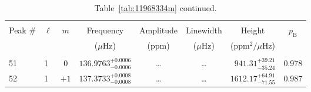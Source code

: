 



\begin{table*}[!]
\caption{Table~\ref{tab:11968334m} continued.}
\label{tab:11968334m2}
\centering
\begin{tabular}{llcrrlrc}
\hline\hline
\\[-8pt]          
Peak \# & $\ell$ & $m$ & \multicolumn{1}{c}{Frequency} & \multicolumn{1}{c}{Amplitude} & \multicolumn{1}{c}{Linewidth} & \multicolumn{1}{c}{Height}& $p_\mathrm{B}$\\
 & & & \multicolumn{1}{c}{($\mu$Hz)} & \multicolumn{1}{c}{(ppm)} & \multicolumn{1}{c}{($\mu$Hz)} & \multicolumn{1}{c}{(ppm$^2/\mu$Hz)}\\
\hline \\[-8pt]
51 & 1 & 0 & $    136.9763_{-      0.0006}^{+      0.0006}$ & \multicolumn{1}{c}{\dots} & \multicolumn{1}{c}{\dots} & $      941.31_{-       35.24}^{+       39.21}$ & 0.978\\[1pt]
52 & 1 & $+1$ & $    137.3733_{-      0.0008}^{+      0.0008}$ & \multicolumn{1}{c}{\dots} & \multicolumn{1}{c}{\dots} & $     1612.17_{-       71.55}^{+       64.91}$ & 0.987\\[1pt]
 

\end{tabular}
\end{table*}
